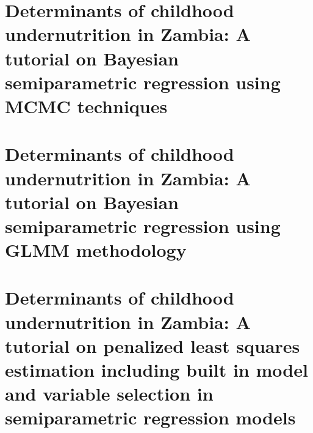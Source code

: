 \documentclass[11pt,a4paper,twoside]{bayesxreport}
\begin{document}
\MakeShortVerb{\|}


\newpage

\chapter[A tutorial
on Bayesian semiparametric regression using MCMC
techniques]{Determinants of childhood undernutrition in Zambia: A
tutorial on Bayesian semiparametric regression using MCMC
techniques} \label{zambiaanalysis}



\chapter[A tutorial
on Bayesian semiparametric regression using GLMM
methodology]{Determinants of childhood undernutrition in Zambia: A
tutorial on Bayesian semiparametric regression using GLMM
methodology} \label{remlregzambiaanalysis}



\chapter[Simultaneously selecting variables and smoothing parameters] {Determinants of childhood undernutrition in Zambia: A
tutorial on penalized least squares estimation including built in model and
variable selection in semiparametric regression models}
\label{zambia_step_analysis}




\end{document}
